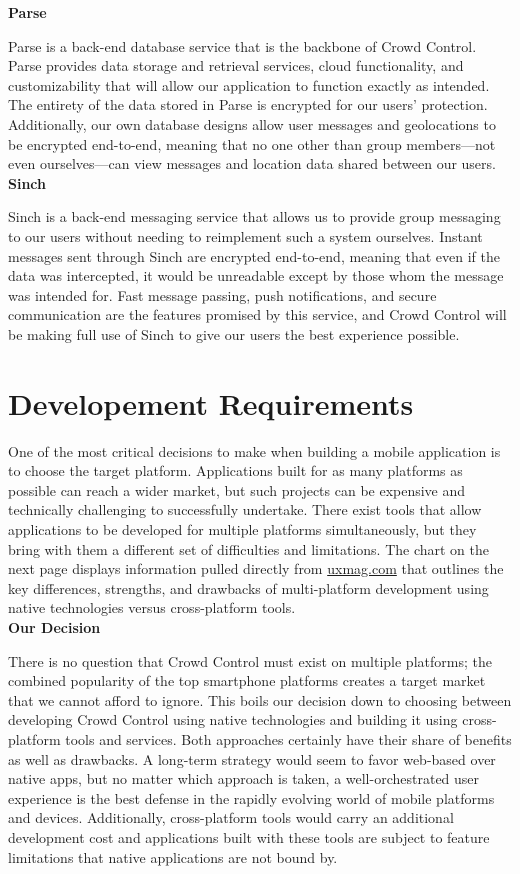 \noindent
\textbf{Parse}

Parse is a back-end database service that is the backbone of Crowd Control. Parse provides data
storage and retrieval services, cloud functionality, and customizability that will allow our application to
function exactly as intended. The entirety of the data stored in Parse is encrypted for our users'
protection. Additionally, our own database designs allow user messages and geolocations to be
encrypted end-to-end, meaning that no one other than group members---not even ourselves---can view
messages and location data shared between our users.\\

\noindent
\textbf{Sinch}

Sinch is a back-end messaging service that allows us to provide group messaging to our users without
needing to reimplement such a system ourselves. Instant messages sent through Sinch are encrypted
end-to-end, meaning that even if the data was intercepted, it would be unreadable except by those
whom the message was intended for. Fast message passing, push notifications, and secure
communication are the features promised by this service, and Crowd Control will be making full use of
Sinch to give our users the best experience possible.



\section{Developement Requirements}

One of the most critical decisions to make when building a mobile application is to choose the target
platform. Applications built for as many platforms as possible can reach a wider market, but such
projects can be expensive and technically challenging to successfully undertake. There exist tools that
allow applications to be developed for multiple platforms simultaneously, but they bring with them a
different set of difficulties and limitations. The chart on the next page displays information pulled directly from \url{uxmag.com} that outlines the key differences, strengths, and drawbacks of multi-platform
development using native technologies versus cross-platform tools.\\

\noindent
\textbf{Our Decision}

There is no question that Crowd Control must exist on multiple platforms; the combined popularity of
the top smartphone platforms creates a target market that we cannot afford to ignore. This boils our
decision down to choosing between developing Crowd Control using native technologies and
building it using cross-platform tools and services. Both approaches certainly have their share of
benefits as well as drawbacks. A long-term strategy would seem to favor web-based over native apps,
but no matter which approach is taken, a well-orchestrated user experience is the best defense in the
rapidly evolving world of mobile platforms and devices. Additionally, cross-platform tools would carry
an additional development cost and applications built with these tools are subject to feature limitations
that native applications are not bound by.

